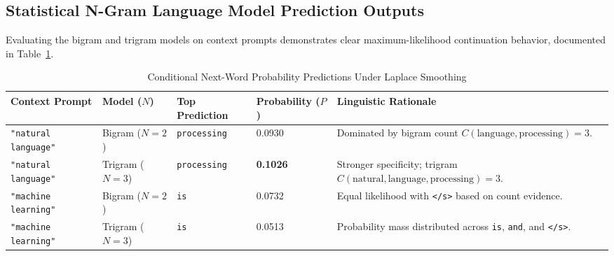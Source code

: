 \documentclass[12pt,a4paper]{report}
\begin{document}
\subsection{Statistical N-Gram Language Model Prediction Outputs}
Evaluating the bigram and trigram models on context prompts demonstrates clear maximum-likelihood continuation behavior, documented in Table~\ref{tab:exp6_ngram_results}.
\begin{table}[H]
\centering
\small
\caption{Conditional Next-Word Probability Predictions Under Laplace Smoothing}
\label{tab:exp6_ngram_results}
\begin{tabularx}{\textwidth}{llllX}
\toprule
\textbf{Context Prompt} & \textbf{Model ($N$)} & \textbf{Top Prediction} & \textbf{Probability ($P$)} & \textbf{Linguistic Rationale} \\
\midrule
\texttt{"natural language"} & Bigram ($N=2$) & \texttt{processing} & 0.0930 & Dominated by bigram count $C(\text{language}, \text{processing})=3$. \\
\texttt{"natural language"} & Trigram ($N=3$) & \texttt{processing} & \textbf{0.1026} & Stronger specificity; trigram $C(\text{natural}, \text{language}, \text{processing})=3$. \\
\texttt{"machine learning"} & Bigram ($N=2$) & \texttt{is} & 0.0732 & Equal likelihood with \texttt{</s>} based on count evidence. \\
\texttt{"machine learning"} & Trigram ($N=3$) & \texttt{is} & 0.0513 & Probability mass distributed across \texttt{is}, \texttt{and}, and \texttt{</s>}. \\
\bottomrule
\end{tabularx}
\end{table}
\end{document}
